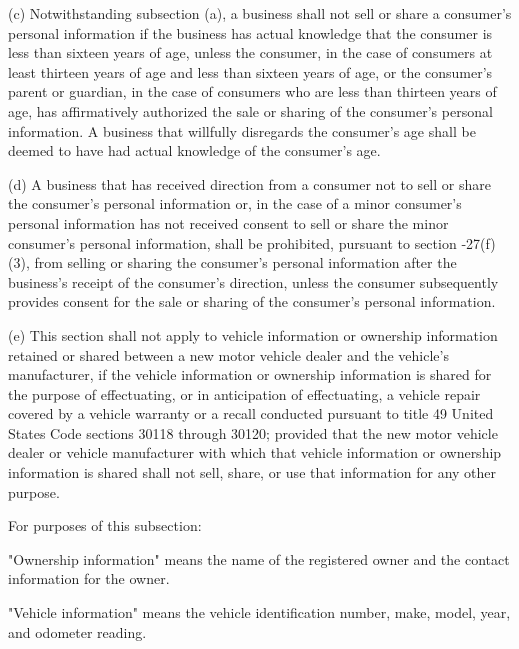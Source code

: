      (c)  Notwithstanding subsection (a), a business shall not sell or share a consumer's personal information if the business has actual knowledge that the consumer is less than sixteen years of age, unless the consumer, in the case of consumers at least thirteen years of age and less than sixteen years of age, or the consumer's parent or guardian, in the case of consumers who are less than thirteen years of age, has affirmatively authorized the sale or sharing of the consumer's personal information.  A business that willfully disregards the consumer's age shall be deemed to have had actual knowledge of the consumer's age.

     (d)  A business that has received direction from a consumer not to sell or share the consumer's personal information or, in the case of a minor consumer's personal information has not received consent to sell or share the minor consumer's personal information, shall be prohibited, pursuant to section    ‑27(f)(3), from selling or sharing the consumer's personal information after the business's receipt of the consumer's direction, unless the consumer subsequently provides consent for the sale or sharing of the consumer's personal information.

     (e)  This section shall not apply to vehicle information or ownership information retained or shared between a new motor vehicle dealer and the vehicle's manufacturer, if the vehicle information or ownership information is shared for the purpose of effectuating, or in anticipation of effectuating, a vehicle repair covered by a vehicle warranty or a recall conducted pursuant to title 49 United States Code sections 30118 through 30120; provided that the new motor vehicle dealer or vehicle manufacturer with which that vehicle information or ownership information is shared shall not sell, share, or use that information for any other purpose.

     For purposes of this subsection:

     "Ownership information" means the name of the registered owner and the contact information for the owner.

     "Vehicle information" means the vehicle identification number, make, model, year, and odometer reading.

